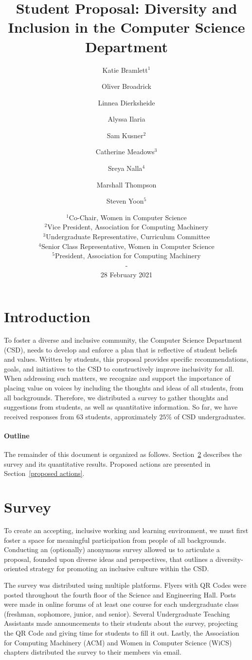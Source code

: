 \documentclass{article}
\title{Student Proposal: Diversity and Inclusion in the Computer Science Department}
\author{
Katie Bramlett$^1$\and
Oliver Broadrick\and
Linnea Dierksheide\and
Alyssa Ilaria\and
Sam Kusner$^2$\and
Catherine Meadows$^3$\and
Sreya Nalla$^4$\and
Marshall Thompson\and
Steven Yoon$^5$
}
\date{%
    $^1$Co-Chair, Women in Computer Science\\
    $^2$Vice President, Association for Computing Machinery\\
    $^3$Undergraduate Representative, Curriculum Committee\\
    $^4$Senior Class Representative, Women in Computer Science\\
    $^5$President, Association for Computing Machinery\\
    -\\
    28 February 2021
}
\begin{document}
\maketitle

\section{Introduction}
To foster a diverse and inclusive community, the Computer Science Department (CSD), 
needs to develop and enforce a plan that is reflective of student beliefs and values.
Written by students, this proposal
provides specific recommendations, goals, and initiatives
to the CSD to constructively improve
inclusivity for all.
When addressing such matters, we recognize and support the importance of 
placing value on voices by including the thoughts and ideas of all students, from all backgrounds.
Therefore, we distributed a survey to gather thoughts and suggestions from students, as well as 
quantitative information. So far, we have
received responses from $63$ students, approximately $25\%$ of CSD undergraduates.

\paragraph{Outline}
The remainder of this document is organized as follows.
Section~\ref{survey} describes the survey and its quantitative results.
Proposed actions are presented in Section~\ref{proposed actions}.

\section{Survey}\label{survey}
To create an accepting, inclusive working and learning environment, we must 
first foster a space for meaningful participation from people of all backgrounds.
Conducting an (optionally) anonymous survey allowed us to articulate a proposal, 
founded upon diverse ideas and perspectives, that outlines a diversity-oriented
strategy for promoting an inclusive culture within the CSD.

The survey was distributed using multiple platforms. Flyers with QR Codes were posted
throughout the fourth floor of the Science and Engineering Hall.
Posts were made in online forums of at least one course
for each undergraduate class (freshman, sophomore, junior, and senior).
Several Undergraduate Teaching Assistants made announcements to their 
students about the survey, projecting the QR Code and giving time
for students to fill it out. Lastly, the Association for Computing Machinery (ACM) and Women 
in Computer Science (WiCS) chapters distributed the survey to their members via email. 
\end{document}
